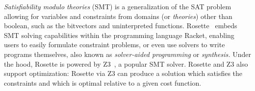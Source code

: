 \textit{Satisfiability modulo theories} (SMT)
  is a generalization of the SAT problem
  allowing for variables and constraints
  from domains
  (or \textit{theories})
  other than boolean,
  such as the bitvectors
  and uninterpreted functions.
Rosette~\cite{torlak2013growing,torlak2014lightweight}
  embeds SMT solving capabilities
  within the programming language
  Racket,
  enabling users to easily formulate
  constraint problems,
  or even use solvers
  to write programs themselves,
  also known as 
  \textit{solver-aided programming}
  or \textit{synthesis.}
Under the hood,
  Rosette is powered by
  Z3~\cite{de2008z3},
  a popular SMT solver.
Rosette and Z3 also support
  optimization:
  Rosette via Z3 can produce
  a solution which satisfies
  the constraints
  and which is optimal
  relative to a given
  cost function.


%

%
%
%
%
%
%
%
%
%
%
%
%
%
%
%






